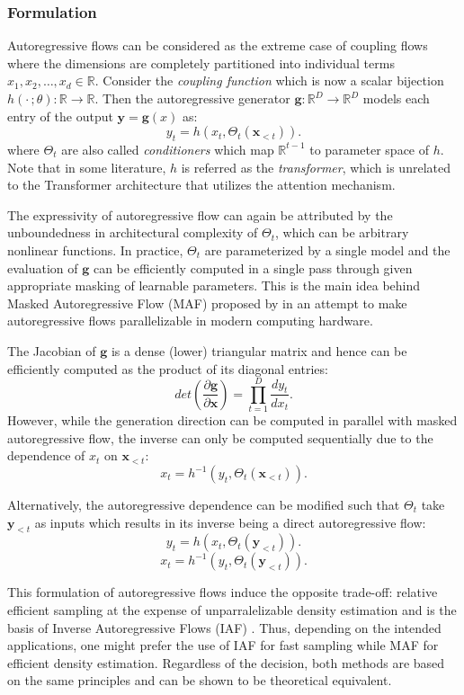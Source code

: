 \subsubsection{Formulation}
Autoregressive flows can be considered as the extreme case of coupling flows
where the dimensions are completely partitioned into individual terms $x_1,
x_2,\ldots, x_d \in \mathbb{R}$. Consider the \textit{coupling function} which is now a scalar
bijection $h(
\cdot\,; \theta
): \mathbb{R} \to \mathbb{R}$. Then the autoregressive generator
$\mathbf{g}: \mathbb{R}^D \to \mathbb{R}^D$ models each entry of
the output $\mathbf{y} = \mathbf{g}(x)$ as:
$$
y_t = h(x_t, \Theta_t(\mathbf{x}_{<t}))
.$$
where $\Theta_t$ are also called \textit{conditioners} which map
$\mathbb{R}^{t-1}$ to parameter space of $h$. Note that in some literature, $h$ is
referred as the \textit{transformer}, which is unrelated to the
Transformer architecture that utilizes the attention mechanism.

The expressivity of
autoregressive flow can again be attributed by the unboundedness in
architectural complexity of $\Theta_t$, which can be arbitrary nonlinear
functions. In practice, $\Theta_t$ are parameterized by a single model and the evaluation of $\mathbf{g}$ can be efficiently
computed in a single pass through given appropriate masking of
  learnable parameters. This is the main idea behind Masked Autoregressive
  Flow (MAF) proposed by \cite{papamakariosMaskedAutoregressiveFlow2017}
  in an attempt to make autoregressive flows parallelizable in modern
  computing hardware.

The Jacobian of $\textbf{g}$ is a dense (lower) triangular matrix and hence
can be efficiently computed as the product of its diagonal entries:
$$
det \left(
\frac{\partial \mathbf{g}}{\partial \mathbf{x} }
\right) =  \prod_{t=1}^D \frac{dy_t}{dx_t}
.$$
However, while the generation direction can be computed in parallel with
masked
autoregressive flow,  the inverse can only be computed sequentially due to the
dependence of $x_{t}$ on $\textbf{x}_{<t}$:
$$
x_{t} = h^{-1}(y_t,
\Theta_t(\textbf{x}_{<t}))
.$$

Alternatively, the autoregressive dependence can be modified such that
$\Theta_t$ take $\mathbf{y}_{<t}$ as inputs which results in its inverse being a direct autoregressive flow:
$$
y_t = h(x_t, \Theta_t(\mathbf{y}_{<t}))
.$$
$$
x_{t} = h^{-1}(y_t, \Theta_t(\textbf{y}_{<t}))
.$$

This formulation of autoregressive flows induce the opposite trade-off: relative
efficient sampling at the expense of unparralelizable density estimation and is
the basis of Inverse Autoregressive Flows (IAF)
\cite{kingmaImprovedVariationalInference2016}. Thus, depending on the intended
applications, one might prefer the use of IAF for fast sampling while MAF for
efficient density estimation. Regardless of the decision, both methods are based
on the same principles and can be shown to be theoretical equivalent.

